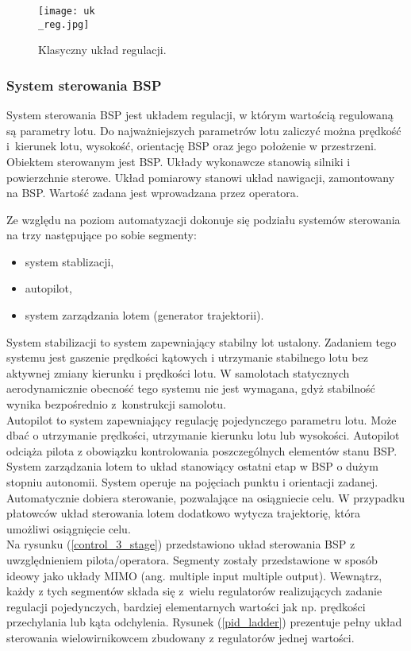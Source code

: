 \begin{figure}[!h]
   	\centering
      	\texttt{[image: uk\\\_reg.jpg]}
      	\caption{Klasyczny układ regulacji.}
      	\label{reg}
\end{figure}

\subsubsection{System sterowania BSP}
System sterowania BSP jest układem regulacji, w którym wartością regulowaną są parametry lotu. Do najważniejszych parametrów lotu zaliczyć można prędkość i~kierunek lotu, wysokość, orientację BSP oraz jego położenie w przestrzeni. Obiektem sterowanym jest BSP. Układy wykonawcze stanowią silniki i powierzchnie sterowe. Układ pomiarowy stanowi układ nawigacji, zamontowany na BSP. Wartość zadana jest wprowadzana przez operatora.

 Ze względu na poziom automatyzacji dokonuje się podziału systemów sterowania na trzy następujące po sobie segmenty:
\begin{itemize}
\item system stablizacji,
\item autopilot,
\item system zarządzania lotem (generator trajektorii).
\end{itemize}
System stabilizacji to system zapewniający stabilny lot ustalony. Zadaniem tego systemu jest gaszenie prędkości kątowych i utrzymanie stabilnego lotu bez aktywnej zmiany kierunku i prędkości lotu. W samolotach statycznych aerodynamicznie obecność tego systemu nie jest wymagana, gdyż stabilność wynika bezpośrednio z~konstrukcji samolotu.\\

Autopilot to system zapewniający regulację pojedynczego parametru lotu. Może dbać o utrzymanie prędkości, utrzymanie kierunku lotu lub wysokości. Autopilot odciąża pilota z obowiązku kontrolowania poszczególnych elementów stanu BSP.\\

System zarządzania lotem to układ stanowiący ostatni etap w BSP o dużym stopniu autonomii. System operuje na pojęciach punktu i orientacji zadanej. Automatycznie dobiera sterowanie, pozwalające na osiągniecie celu. W przypadku płatowców układ sterowania lotem dodatkowo wytycza trajektorię, która umożliwi osiągnięcie celu.\\

Na rysunku (\ref{control_3_stage}) przedstawiono układ sterowania BSP z uwzględnieniem pilota/operatora. Segmenty zostały przedstawione w sposób ideowy jako układy MIMO (ang. multiple input multiple output). Wewnątrz, każdy z tych segmentów składa się z~wielu regulatorów realizujących zadanie regulacji pojedynczych, bardziej elementarnych wartości jak np. prędkości przechylania lub kąta odchylenia. Rysunek (\ref{pid_ladder}) prezentuje pełny układ sterowania wielowirnikowcem zbudowany z regulatorów jednej wartości.\\

